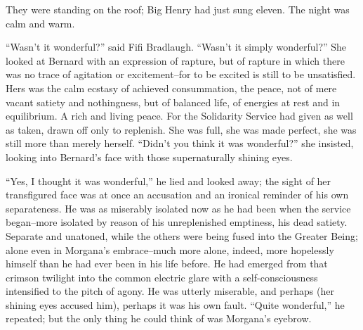 \documentclass[12pt]{report}
\begin{document}
They were standing on the roof; Big Henry had just sung eleven. The
night was calm and warm.

``Wasn't it wonderful?'' said Fifi Bradlaugh. ``Wasn't it simply
wonderful?'' She looked at Bernard with an expression of rapture, but of
rapture in which there was no trace of agitation or excitement--for to
be excited is still to be unsatisfied. Hers was the calm ecstasy of
achieved consummation, the peace, not of mere vacant satiety and
nothingness, but of balanced life, of energies at rest and in
equilibrium. A rich and living peace. For the Solidarity Service had
given as well as taken, drawn off only to replenish. She was full, she
was made perfect, she was still more than merely herself. ``Didn't you
think it was wonderful?'' she insisted, looking into Bernard's face with
those supernaturally shining eyes.

``Yes, I thought it was wonderful,'' he lied and looked away; the sight
of her transfigured face was at once an accusation and an ironical
reminder of his own separateness. He was as miserably isolated now as he
had been when the service began--more isolated by reason of his
unreplenished emptiness, his dead satiety. Separate and unatoned, while
the others were being fused into the Greater Being; alone even in
Morgana's embrace--much more alone, indeed, more hopelessly himself than
he had ever been in his life before. He had emerged from that crimson
twilight into the common electric glare with a self-consciousness
intensified to the pitch of agony. He was utterly miserable, and perhaps
(her shining eyes accused him), perhaps it was his own fault. ``Quite
wonderful,'' he repeated; but the only thing he could think of was
Morgana's eyebrow.
\end{document}
